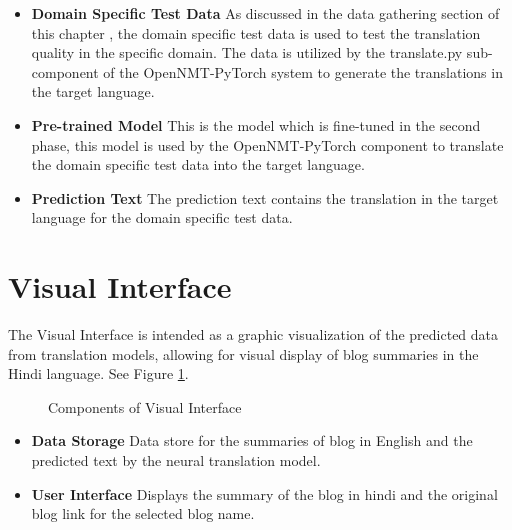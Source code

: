 \begin{itemize}
    \item \textbf{Domain Specific Test Data} As discussed in the data gathering section of this chapter , the domain specific test data is used to test the translation quality in the specific domain. The data is utilized by the translate.py sub-component of the OpenNMT-PyTorch system to generate the translations in the target language.
    \item \textbf{Pre-trained Model} This is the model which is fine-tuned in the second phase, this model is used by the OpenNMT-PyTorch component to translate the domain specific test data into the target language.
    \item \textbf{Prediction Text} The prediction text contains the translation in the target language for the domain specific test data.
\end{itemize}


\section{Visual Interface}
The Visual Interface is intended as a graphic visualization of the predicted data from translation models, allowing for visual display of blog summaries in the Hindi language. See Figure \ref{visualinterface}.

\begin{figure}[h]
\caption{Components of Visual Interface} \label{visualinterface}
\end{figure}

\begin{itemize}
    \item \textbf{Data Storage} Data store for the summaries of blog in English and the predicted text by the neural translation model.
    \item \textbf{User Interface} Displays the summary of the blog in hindi and the original blog link for the selected blog name.
\end{itemize}


